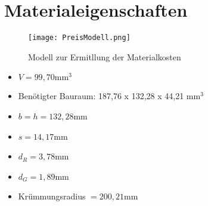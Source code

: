 \chapter{Materialeigenschaften}

\begin{figure}[h]
	\centering
	\texttt{[image: PreisModell.png]}
	\caption{Modell zur Ermitllung der Materialkosten}
\end{figure}
\begin{itemize}
		\item $V = 99,70\mathrm{mm}^3$
		\item Benötigter Bauraum: 187,76 x 132,28 x 44,21 mm$^3$
		\item $b = h = 132,28$mm
		\item $s = 14,17$mm
		\item $d_R = 3,78$mm
		\item $d_G = 1,89$mm
		\item Krümmungsradius $=200,21$mm
\end{itemize}
